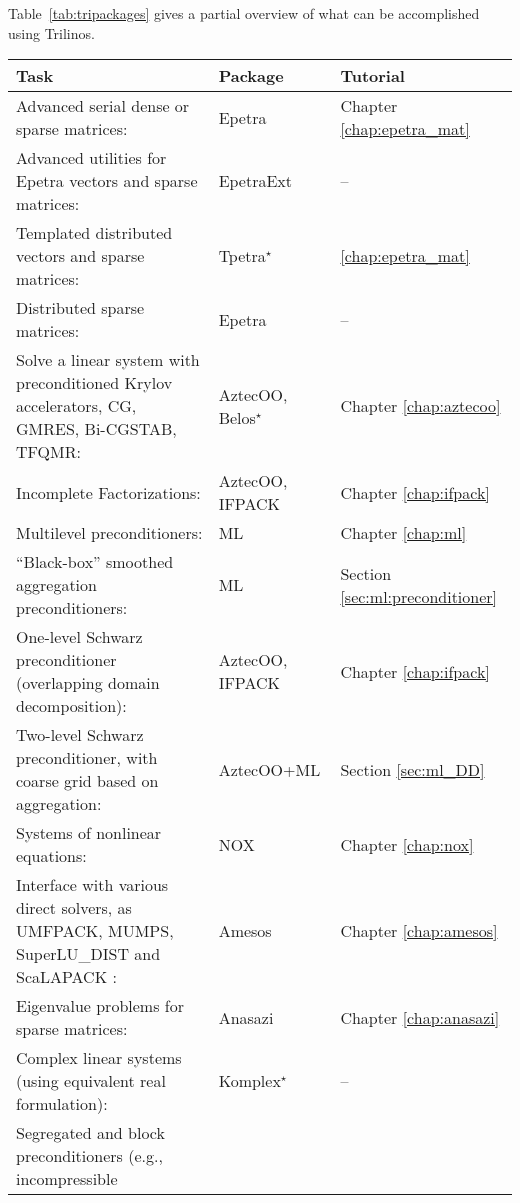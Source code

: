 Table~\ref{tab:tripackages} gives a partial overview of what can be
accomplished using Trilinos.
\begin{table}[htbp]
  \centering
  \begin{tabular}{| p{8cm} | p{2.5cm} | p{3cm} |}
    \hline
    {\bf Task} & {\bf Package} & {\bf Tutorial}\\
    \hline
    \hline
    Advanced serial dense or sparse matrices: & Epetra 
    & Chapter \ref{chap:epetra_mat} \\
    Advanced utilities for Epetra vectors and sparse matrices: &
    EpetraExt & --  
    \\
    \hline
    Templated distributed vectors and sparse matrices: & Tpetra$^\star$
    & \ref{chap:epetra_mat} \\
    \hline
    Distributed sparse matrices:& Epetra & -- \\
    \hline
    Solve a linear system with preconditioned Krylov accelerators, 
    CG, GMRES, Bi-CGSTAB, TFQMR:& AztecOO, Belos$^\star$ &
    Chapter \ref{chap:aztecoo} \\
    \hline
    Incomplete Factorizations:& AztecOO, \newline IFPACK &
    Chapter \ref{chap:ifpack} \\
    \hline
    Multilevel  preconditioners: & ML & Chapter \ref{chap:ml} \\
    \hline
    ``Black-box'' smoothed aggregation preconditioners:& ML & Section
    \ref{sec:ml:preconditioner} \\
    \hline
    One-level Schwarz preconditioner (overlapping domain
    decomposition):& AztecOO, \newline IFPACK & Chapter \ref{chap:ifpack} \\
    Two-level Schwarz preconditioner, with coarse grid based on
    aggregation:& AztecOO+ML & Section \ref{sec:ml_DD} \\
    \hline
    Systems of nonlinear equations:& NOX & Chapter \ref{chap:nox} \\
    Interface with various direct solvers, as UMFPACK, MUMPS, SuperLU\_DIST
    and ScaLAPACK :& Amesos & Chapter \ref{chap:amesos} \\
    \hline
    Eigenvalue problems for sparse matrices:& Anasazi &
    Chapter \ref{chap:anasazi} 
    \\
    \hline
    Complex linear systems (using equivalent real formulation):&
    Komplex$^\star$ & -- \\
    \hline
    Segregated and block preconditioners (e.g., incompressible

\end{tabular}
\end{table}
